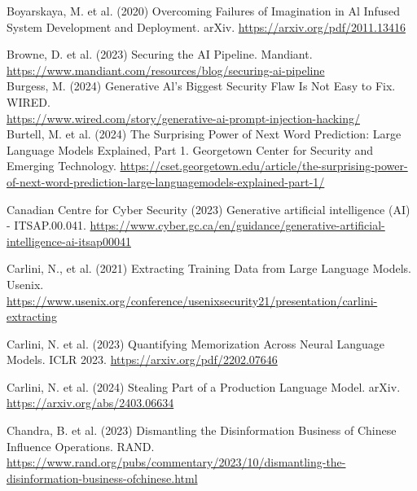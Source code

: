 \documentclass[10pt]{article}
\begin{document}
Boyarskaya, M. et al. (2020) Overcoming Failures of Imagination in Al Infused System Development and Deployment. arXiv. \href{https://arxiv.org/pdf/2011.13416}{https://arxiv.org/pdf/2011.13416}

Browne, D. et al. (2023) Securing the AI Pipeline. Mandiant.\\
\href{https://www.mandiant.com/resources/blog/securing-ai-pipeline}{https://www.mandiant.com/resources/blog/securing-ai-pipeline}\\
Burgess, M. (2024) Generative Al's Biggest Security Flaw Is Not Easy to Fix. WIRED.\\
\href{https://www.wired.com/story/generative-ai-prompt-injection-hacking/}{https://www.wired.com/story/generative-ai-prompt-injection-hacking/}\\
Burtell, M. et al. (2024) The Surprising Power of Next Word Prediction: Large Language Models Explained, Part 1. Georgetown Center for Security and Emerging Technology. \href{https://cset.georgetown.edu/article/the-surprising-power-of-next-word-prediction-large-languagemodels-explained-part-1/}{https://cset.georgetown.edu/article/the-surprising-power-of-next-word-prediction-large-languagemodels-explained-part-1/}

Canadian Centre for Cyber Security (2023) Generative artificial intelligence (AI) - ITSAP.00.041. \href{https://www.cyber.gc.ca/en/guidance/generative-artificial-intelligence-ai-itsap00041}{https://www.cyber.gc.ca/en/guidance/generative-artificial-intelligence-ai-itsap00041}

Carlini, N., et al. (2021) Extracting Training Data from Large Language Models. Usenix. \href{https://www.usenix.org/conference/usenixsecurity21/presentation/carlini-extracting}{https://www.usenix.org/conference/usenixsecurity21/presentation/carlini-extracting}

Carlini, N. et al. (2023) Quantifying Memorization Across Neural Language Models. ICLR 2023. \href{https://arxiv.org/pdf/2202.07646}{https://arxiv.org/pdf/2202.07646}

Carlini, N. et al. (2024) Stealing Part of a Production Language Model. arXiv. \href{https://arxiv.org/abs/2403.06634}{https://arxiv.org/abs/2403.06634}

Chandra, B. et al. (2023) Dismantling the Disinformation Business of Chinese Influence Operations. RAND. \href{https://www.rand.org/pubs/commentary/2023/10/dismantling-the-disinformation-business-ofchinese.html}{https://www.rand.org/pubs/commentary/2023/10/dismantling-the-disinformation-business-ofchinese.html}
\end{document}
